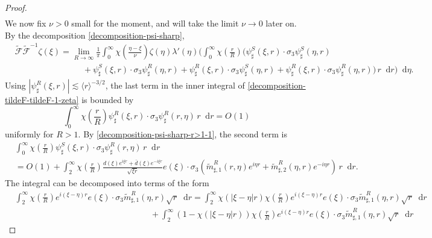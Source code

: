 \documentclass[11 pt]{amsart}
\theoremstyle{definition}
\theoremstyle{remark}
\numberwithin{equation}{section}
\newcommand{\dd}{\mathop{}\!\mathrm{d}}
\begin{document}
\begin{proof}
\begin{align*}
\end{align*}
We now fix $\nu>0$ small for the moment, and will take the limit $\nu\to 0$ later on. By the decomposition \eqref{decomposition-psi-sharp},
\begin{align}
\nonumber &\widetilde{\mathcal F} \widetilde{\mathcal F}^{-1} \zeta (\xi)
= \lim_{R \to \infty} \frac{1}{\pi} \int_0^\infty \chi (\frac{\eta-\xi}{\nu}) \zeta(\eta)  \lambda'(\eta)   \Bigg( \int_0^\infty \chi \left( \frac{r}{R} \right)\Bigg( \psi_\sharp^S (\xi,r) \cdot \sigma_3  \psi_\sharp^S(\eta ,r) \\
\label{decomposition-tildeF-tildeF-1-zeta} &\qquad \qquad \qquad \qquad + \psi_\sharp^S(\xi,r) \cdot \sigma_3  \psi_\sharp^R(\eta ,r) + \psi_\sharp^R(\xi,r) \cdot \sigma_3  \psi_\sharp^S(\eta,r)+ \psi_\sharp^R(\xi,r) \cdot \sigma_3  \psi_\sharp^R(\eta,r) \Bigg) \,r \dd r  \Bigg) \dd \eta .
\end{align}
Using $|\psi_\sharp^R(\xi,r)|\lesssim \langle r \rangle^{-3/2}$, the last term in the inner integral of \eqref{decomposition-tildeF-tildeF-1-zeta} is bounded by
\begin{equation} \label{decomposition-tildeF-tildeF-1-zeta-bd1} 
\int_0^\infty  \chi \left( \frac{r}{R} \right)  \psi_\sharp^R(\xi,r) \cdot \sigma_3  \psi_\sharp^R(r,\eta)  \,r \dd r =O(1) 
\end{equation}
uniformly for $R>1$. By \eqref{decomposition-psi-sharp-r>1-1}, the second term is
\begin{align*}
& \int_0^\infty \chi \left( \frac{r}{R} \right)  \psi_\sharp^S(\xi,r) \cdot \sigma_3  \psi_\sharp^R(r,\eta)  \,r \dd r \\
& = O(1)+\int_2^\infty \chi \left( \frac{r}{R} \right)  \frac{d(\xi)e^{i\xi r}+\bar d(\xi)e^{-i\xi r}}{\sqrt{\xi r}} e(\xi)\cdot \sigma_3\left(\widetilde m_{\sharp,1}^R(r,\eta)e^{i\eta r}+\widetilde m_{\sharp,2}^R(\eta,r) e^{-i\eta r} \right) \,r \dd r .
\end{align*}
The integral can be decomposed into terms of the form
\begin{align*}
 & \int_2^\infty  \chi \left( \frac{r}{R} \right) e^{i(\xi-\eta)r}e(\xi) \cdot \sigma_3 \widetilde m_{\sharp,1}^R(\eta,r) \sqrt{r} \dd r   = \int_2^\infty \chi(|\xi-\eta|r) \chi \left( \frac{r}{R} \right) e^{i(\xi-\eta)r}e(\xi) \cdot \sigma_3 \widetilde m_{\sharp,1}^R(\eta,r) \sqrt{r} \dd r\\
 & \qquad \qquad \qquad \qquad \qquad \qquad \qquad \qquad+\int_2^\infty (1-\chi(|\xi-\eta|r)) \chi \left( \frac{r}{R} \right) e^{i(\xi-\eta)r}e(\xi) \cdot \sigma_3 \widetilde m_{\sharp,1}^R(\eta,r) \sqrt{r} \dd r

\end{align*}
\end{proof}
\end{document}
